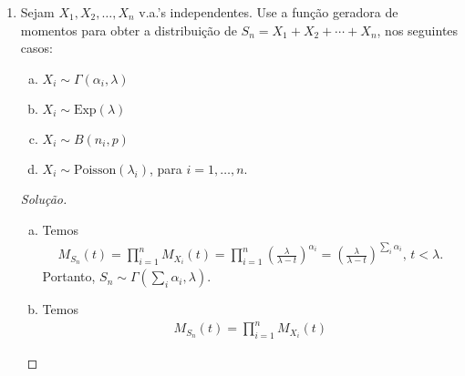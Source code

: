 \documentclass[../Notas.tex]{subfiles}
\begin{document}
\begin{enumerate}
\begin{proof}
\begin{enumerate}[a)]
\begin{align*}
                + \int_{-\infty}^0 e^{x(t+1)} \, dx \right) \\
                &= -\frac{1}{2}\cdot\frac{1}{t-1} + \frac{1}{2}\cdot\frac{1}{t+1} \\
                &= \frac{1}{1-t^2} \\
                &= \sum_{k=0}^{\infty} t^{2k} \\
                &= \sum_{k=0}^{\infty} (2k)!\frac{t^{2k}}{(2k)!}.
            \end{align*}
            Portanto,
            \[
            EX^m = \begin{cases}
            0, m \text{ impar} \\
            m!, m \text{ par}
            \end{cases}.
            \]
        \end{enumerate}
    \end{proof}
    \item Sejam $X_1,X_2,\dots,X_n$ v.a.’s independentes. Use a função geradora de momentos para obter a distribuição de $S_n = X_1 + X_2 + \cdots + X_n$, nos seguintes casos:
    \begin{enumerate}[a)]
    \item $X_i\sim\Gamma(\alpha_i,\lambda)$
    \item $X_i\sim\text{Exp}(\lambda)$
    \item $X_i\sim B(n_i , p)$
    \item $X_i\sim\text{Poisson}(\lambda_i)$, para $i = 1,\dots, n.$
    \end{enumerate}
    \begin{proof}[Solução]
        \begin{enumerate}[a)]
            \item Temos
            \begin{align*}
                M_{S_n}(t) = \prod_{i=1}^n M_{X_i}(t)
                           = \prod_{i=1}^n \left(
                           \frac{\lambda}{\lambda - t}\right)^{\alpha_i}
                           = \left(
                           \frac{\lambda}{\lambda - t}\right)^{\sum_i \alpha_i}, \,
                           t < \lambda.
            \end{align*}
            Portanto, $S_n\sim\Gamma\left(\sum_i \alpha_i, \lambda\right)$.
            \item Temos
            \begin{align*}
                M_{S_n}(t) = \prod_{i=1}^n M_{X_i}(t)

\end{align*}
\end{enumerate}
\end{proof}
\end{enumerate}
\end{document}
